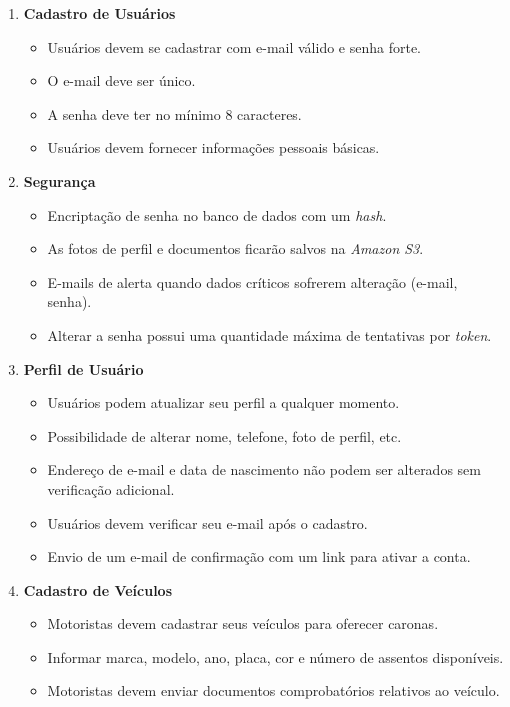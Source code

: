 \begin{enumerate}
	
	\item \textbf{Cadastro de Usuários}
	\begin{itemize}
		\item Usuários devem se cadastrar com e-mail válido e senha forte.
		\item O e-mail deve ser único.
		\item A senha deve ter no mínimo 8 caracteres.
		\item Usuários devem fornecer informações pessoais básicas.
		
	\end{itemize}
	
	\item \textbf{Segurança}
	
	\begin{itemize}
		\item Encriptação de senha no banco de dados com um\textit{ hash}.
		\item As fotos de perfil e documentos ficarão salvos na \textit{Amazon S3}.
		\item E-mails de alerta quando dados críticos sofrerem alteração (e-mail, senha).
		\item Alterar a senha possui uma quantidade máxima de tentativas por \textit{token}.
	\end{itemize}
	
	\item \textbf{Perfil de Usuário}
	
	\begin{itemize}
		\item Usuários podem atualizar seu perfil a qualquer momento.
		\item Possibilidade de alterar nome, telefone, foto de perfil, etc.
		\item Endereço de e-mail e data de nascimento não podem ser alterados sem verificação adicional.
		\item Usuários devem verificar seu e-mail após o cadastro.
		\item Envio de um e-mail de confirmação com um link para ativar a conta.
	\end{itemize}
	
	\item \textbf{Cadastro de Veículos}
	
	\begin{itemize}
		\item Motoristas devem cadastrar seus veículos para oferecer caronas.
		\item Informar marca, modelo, ano, placa, cor e número de assentos disponíveis.
		\item Motoristas devem enviar documentos comprobatórios relativos ao veículo.
	\end{itemize}
	

\end{enumerate}
